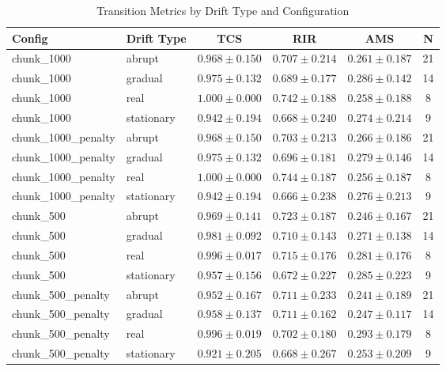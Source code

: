 \begin{table}[ht]
\centering
\caption{Transition Metrics by Drift Type and Configuration}
\label{tab:transition_metrics}
\begin{tabular}{llcccc}
\toprule
Config & Drift Type & TCS & RIR & AMS & N \\
\midrule
chunk_1000 & abrupt & $0.968 \pm 0.150$ & $0.707 \pm 0.214$ & $0.261 \pm 0.187$ & 21 \\
chunk_1000 & gradual & $0.975 \pm 0.132$ & $0.689 \pm 0.177$ & $0.286 \pm 0.142$ & 14 \\
chunk_1000 & real & $1.000 \pm 0.000$ & $0.742 \pm 0.188$ & $0.258 \pm 0.188$ & 8 \\
chunk_1000 & stationary & $0.942 \pm 0.194$ & $0.668 \pm 0.240$ & $0.274 \pm 0.214$ & 9 \\
\midrule
chunk_1000_penalty & abrupt & $0.968 \pm 0.150$ & $0.703 \pm 0.213$ & $0.266 \pm 0.186$ & 21 \\
chunk_1000_penalty & gradual & $0.975 \pm 0.132$ & $0.696 \pm 0.181$ & $0.279 \pm 0.146$ & 14 \\
chunk_1000_penalty & real & $1.000 \pm 0.000$ & $0.744 \pm 0.187$ & $0.256 \pm 0.187$ & 8 \\
chunk_1000_penalty & stationary & $0.942 \pm 0.194$ & $0.666 \pm 0.238$ & $0.276 \pm 0.213$ & 9 \\
\midrule
chunk_500 & abrupt & $0.969 \pm 0.141$ & $0.723 \pm 0.187$ & $0.246 \pm 0.167$ & 21 \\
chunk_500 & gradual & $0.981 \pm 0.092$ & $0.710 \pm 0.143$ & $0.271 \pm 0.138$ & 14 \\
chunk_500 & real & $0.996 \pm 0.017$ & $0.715 \pm 0.176$ & $0.281 \pm 0.176$ & 8 \\
chunk_500 & stationary & $0.957 \pm 0.156$ & $0.672 \pm 0.227$ & $0.285 \pm 0.223$ & 9 \\
\midrule
chunk_500_penalty & abrupt & $0.952 \pm 0.167$ & $0.711 \pm 0.233$ & $0.241 \pm 0.189$ & 21 \\
chunk_500_penalty & gradual & $0.958 \pm 0.137$ & $0.711 \pm 0.162$ & $0.247 \pm 0.117$ & 14 \\
chunk_500_penalty & real & $0.996 \pm 0.019$ & $0.702 \pm 0.180$ & $0.293 \pm 0.179$ & 8 \\
chunk_500_penalty & stationary & $0.921 \pm 0.205$ & $0.668 \pm 0.267$ & $0.253 \pm 0.209$ & 9 \\
\bottomrule
\end{tabular}
\end{table}